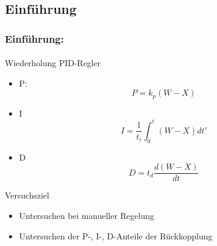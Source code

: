\subsection{Einführung} %
\label{sub:Einführung}
\begin{frame}
    \frametitle{Einführung:}
    \framesubtitle{}
    \begin{block}{Wiederholung PID-Regler}
         \begin{itemize}
             \item P:
             \begin{equation*}
                 P = k_p (W-X)
             \end{equation*}
             \item I
             \begin{equation*}
                 I=\frac{1}{t_i} \int_0^t (W-X) dt'
             \end{equation*}
             \item D
             \begin{equation*}
                 D=t_d \frac{d (W-X)}{dt}
             \end{equation*}
         \end{itemize}
    \end{block}
    \begin{block}{Versuchsziel}
         \begin{itemize}
             \item Untersuchen bei manueller Regelung
             \item Untersuchen der P-, I-, D-Anteile der Rückkopplung
         \end{itemize}
    \end{block}
\end{frame}

